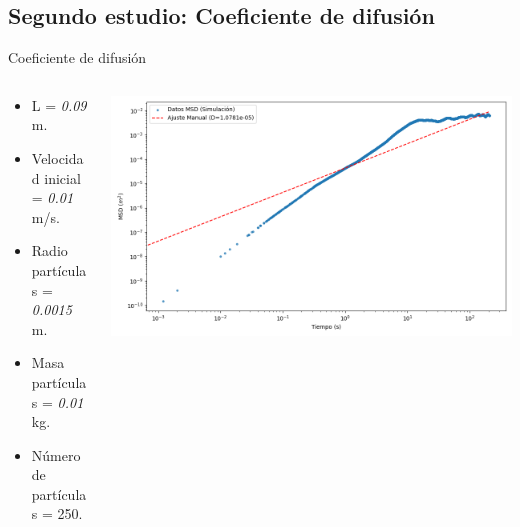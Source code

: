 \documentclass{beamer}
\begin{document}
\subsection{Segundo estudio: Coeficiente de difusión}
\begin{frame}{Coeficiente de difusión}
  \begin{columns}
    \begin{column}{0.30\textwidth}
      \scriptsize {}
      \begin{itemize}
        \item L = \textit{0.09} m. 
        \item Velocidad inicial = \textit{0.01} m/s.
        \item Radio partículas = \textit{0.0015} m.
        \item Masa partículas = \textit{0.01} kg.
        \item Número de partículas = 250.
      \end{itemize}
    \end{column}
    \begin{column}{0.70\textwidth}
      \includegraphics[width=1.10\linewidth]{photoMaterial/MSD_09.png}
    \end{column}
  \end{columns}
\end{frame}
\end{document}
